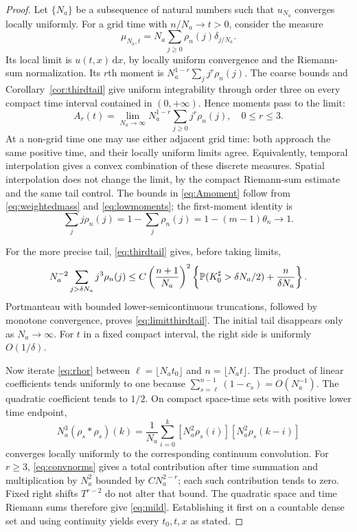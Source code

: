 \documentclass[11pt,letterpaper,reqno]{amsart}
\numberwithin{equation}{section}
\theoremstyle{plain}
\theoremstyle{remark}
\newcommand{\dd}{\,\mathrm d}
\newcommand{\floor}[1]{\lfloor#1\rfloor}
\begin{document}
\begin{proof}
Let $\{ N_a \}$ be a subsequence of natural numbers such that $u_{N_a}$ converges locally uniformly. For a grid time with $n/N_a \to t>0$, consider the measure
\[
 \mu_{N_a,t}=N_a \sum_{j\ge0}\rho_n(j)\delta_{j/N_a}.
\]
Its local limit is $u(t,x)\dd x$, by locally uniform convergence and the Riemann-sum normalization. Its $r$th moment is $N_a^{1-r}\sum_jj^r\rho_n(j)$. The coarse bounds and Corollary~\ref{cor:thirdtail} give uniform integrability through order three on every compact time interval contained in $(0, +\infty)$. Hence moments pass to the limit:
\begin{equation*}
 A_r(t)=\lim_{N_a \to\infty}N^{1-r}_a \sum_{j\ge0}j^r\rho_n(j),\quad0\le r\le3.
\end{equation*}
At a non-grid time one may use either adjacent grid time: both approach the same positive time, and their locally uniform limits agree. Equivalently, temporal interpolation gives a convex combination of these discrete measures. Spatial interpolation does not change the limit, by the compact Riemann-sum estimate and the same tail control. The bounds in \eqref{eq:Amoment} follow from \eqref{eq:weightedmass} and \eqref{eq:lowmoments}; the first-moment identity is
\[
 \sum_jj\rho_n(j)=1-\sum_j\rho_n(j)=1-(m-1)\theta_n\longrightarrow1.
\]

For the more precise tail, \eqref{eq:thirdtail} gives, before taking limits,
\[
 N^{-2}_a \sum_{j>\delta N_a}j^3\rho_n(j)
 \le C\left(\frac{n+1}{N_a}\right)^2
 \left\{\mathbb P(K^{\sharp}_0 > \delta N_a/2)+\frac n{\delta N_a}\right\}.
\]
Portmanteau with bounded lower-semicontinuous truncations, followed by monotone convergence, proves \eqref{eq:limitthirdtail}. The initial tail disappears only as $N_a \to\infty$. For $t$ in a fixed compact interval, the right side is uniformly $O(1/\delta)$.

Now iterate \eqref{eq:rhor} between $\ell=\floor{N_a t_0}$ and $n=\floor{N_a t}$. The product of linear coefficients tends uniformly to one because $\sum_{s=\ell}^{n-1}(1-c_s)=O(N^{-1}_a)$. The quadratic coefficient tends to $1/2$. On compact space-time sets with positive lower time endpoint,
\[
 N^3_a (\rho_s*\rho_s)(k)
 =\frac{1}{N_a} \sum_{i=0}^k[N^2_a \rho_s(i)][N^2_a \rho_s(k-i)]
\]
converges locally uniformly to the corresponding continuum convolution. For $r\ge3$, \eqref{eq:convnorms} gives a total contribution after time summation and multiplication by $N^2_a$ bounded by $CN^{2-r}_a$; each such contribution tends to zero. Fixed right shifts $T^{r-2}$ do not alter that bound. The quadratic space and time Riemann sums therefore give \eqref{eq:mild}. Establishing it first on a countable dense set and using continuity yields every $t_0,t,x$ as stated.
\end{proof}
\end{document}
